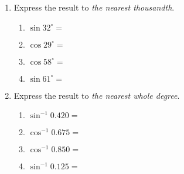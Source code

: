 \begin{enumerate}
\item Express the result to \emph{the nearest thousandth}.  \vspace{0.5cm}
\begin{multicols}{2}
  \begin{enumerate}
    \item $\sin 32^\circ = $ \vspace{1cm}
    \item $\cos 29^\circ =$
    \item $\cos 58^\circ = $ \vspace{1cm}
    \item $\sin 61^\circ =$
  \end{enumerate}
\end{multicols} \vspace{0.5cm}

\item Express the result to \emph{the nearest whole degree}.  \vspace{0.5cm}
\begin{multicols}{2}
  \begin{enumerate}
    \item $\sin^{-1} 0.420 = $ \vspace{1cm}
    \item $\cos^{-1} 0.675 =$
    \item $\cos^{-1} 0.850 = $ \vspace{1cm}
    \item $\sin^{-1} 0.125 =$
  \end{enumerate}
\end{multicols}

\end{enumerate}

  